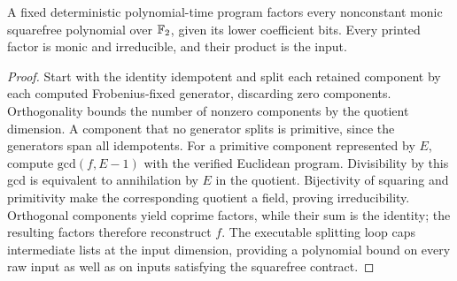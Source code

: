 \begin{lemma}
\label{lem:binary-squarefree-factorization}
\leanok
A fixed deterministic polynomial-time program factors every nonconstant monic
squarefree polynomial over $\mathbb{F}_2$, given its lower coefficient bits. Every
printed factor is monic and irreducible, and their product is the input.
\end{lemma}
\begin{proof}
\leanok
Start with the identity idempotent and split each retained component by each
computed Frobenius-fixed generator, discarding zero components. Orthogonality
bounds the number of nonzero components by the quotient dimension. A component
that no generator splits is primitive, since the generators span all
idempotents. For a primitive component represented by $E$, compute
$\mathrm{gcd}(f,E-1)$ with the verified Euclidean program. Divisibility by this gcd is
equivalent to annihilation by $E$ in the quotient. Bijectivity of squaring and
primitivity make the corresponding quotient a field, proving irreducibility.
Orthogonal components yield coprime factors, while their sum is the identity;
the resulting factors therefore reconstruct $f$. The executable splitting loop
caps intermediate lists at the input dimension, providing a polynomial bound
on every raw input as well as on inputs satisfying the squarefree contract.
\end{proof}

